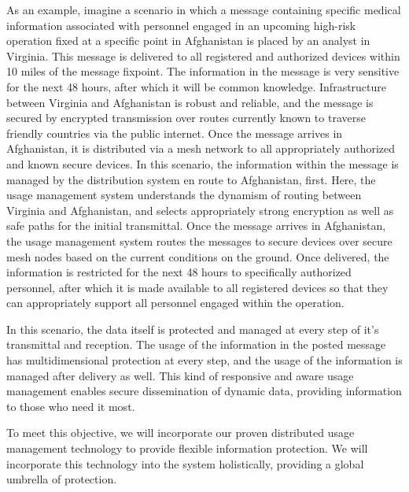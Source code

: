 \documentclass{sbir}
\begin{document}
As an example, imagine a scenario in which a message containing specific medical information associated with personnel engaged in an upcoming high-risk operation fixed at a specific point in Afghanistan is placed by an analyst in Virginia.  This message is delivered to all registered and authorized devices within 10 miles of the message fixpoint.  The information in the message is very sensitive for the next 48 hours, after which it will be common knowledge.  Infrastructure between Virginia and Afghanistan is robust and reliable, and the message is secured by encrypted transmission over routes currently known to traverse friendly countries via the public internet.  Once the message arrives in Afghanistan, it is distributed via a mesh network to all appropriately authorized and known secure devices.  In this scenario, the information within the message is managed by the distribution system en route to Afghanistan, first. Here, the usage management system understands the dynamism of routing between Virginia and Afghanistan, and selects appropriately strong encryption as well as safe paths for the initial transmittal.  Once the message arrives in Afghanistan, the usage management system routes the messages to secure devices over secure mesh nodes based on the current conditions on the ground.  Once delivered, the information is restricted for the next 48 hours to specifically authorized personnel, after which it is made available to all registered devices so that they can appropriately support all personnel engaged within the operation.

In this scenario, the data itself is protected and managed at every step of it's transmittal and reception.  The usage of the information in the posted message has multidimensional protection at every step, and the usage of the information is managed after delivery as well.  This kind of responsive and aware usage management enables secure dissemination of dynamic data, providing information to those who need it most.

To meet this objective, we will incorporate our proven distributed usage management technology to provide flexible information protection.  We will incorporate this technology into the system holistically, providing a global umbrella of protection. 

\end{document}
